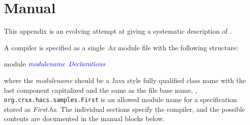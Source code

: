 \documentclass[12pt]{article} %
\begin{document}
\clearpage
\appendix\small

\section{Manual}\label{app:manual}

This appendix is an evolving attempt at giving a systematic description of \HAX.

\begin{manual}\label{man:structure}
  A \HAX compiler is specified as a single \emph{.hx} module file with the following structure:
  \begin{hacs}[mathescape,xleftmargin=\parindent]
module $\text{\it\color{blue}modulename}$
{
  $\text{\it\color{blue}Declarations}$
}
  \end{hacs}
  where the \emph{modulename} should be a Java style fully qualified class name with the last
  component capitalized and the same as the file base name, \eg, \verb|org.crsx.hacs.samples.First|
  is an allowed module name for a specification stored as \emph{First.hx}. The individual sections
  specify the compiler, and the possible contents are documented in the manual blocks below.
\end{manual}
\end{document}
